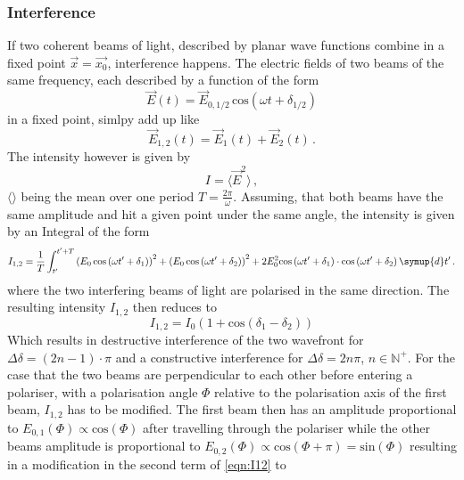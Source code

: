 \subsubsection{Interference}
If two coherent beams of light, described by planar wave functions combine in a fixed point $\vec{x} = \vec{x_0}$, interference happens. The electric fields of two beams of the same frequency, each described by a function of the form 
\begin{equation}
    \vec{E}\left( t\right) = \vec{E}_{0,1/2} \, \text{cos} \left(\omega t + \delta_{1/2}\right)
\end{equation}
in a fixed point, simlpy add up like
\begin{equation}
    \vec{E}_{1,2}\left( t\right) = \vec{E}_{1}\left( t\right) + \vec{E}_{2}\left( t\right) \, .
\end{equation}
The intensity however is given by 
\begin{equation}
    I = \langle \vec{E}^2 \rangle \, ,
\end{equation}
$\langle \rangle$ being the mean over one period $T = \frac{2 \pi}{\omega}$. Assuming, that both beams have the same amplitude and hit a given point under the same angle, the intensity is given by an Integral of the form
\begin{equation}
    I_{1,2} = \frac{1}{T} \int_{t'}^{t' + T} \left( E_0 \, \text{cos}\left( \omega t' + \delta_1 \right) \right)^2 + \left( E_0 \, \text{cos}\left( \omega t' + \delta_2 \right) \right)^2 + 2 E_0^2 \text{cos}\left( \omega t' + \delta_1 \right) \cdot \text{cos}\left( \omega t' + \delta_2 \right) \symup{d}t' \, . 
\end{equation}
where the two interfering beams of light are polarised in the same direction.
The resulting intensity $I_{1,2}$ then reduces to 
\begin{equation}
    \label{eqn:I12}
    I_{1,2} = I_0 \left( 1 + \text{cos}\left( \delta_1 - \delta_2 \right) \right)
\end{equation}
Which results in destructive interference of the two wavefront for $\Delta \delta = \left( 2n - 1 \right) \cdot \pi$ and a constructive interference for $\Delta \delta = 2 n \pi $, $n \in \mathbb{N}^+$.
For the case that the two beams are perpendicular to each other before entering a polariser, with a polarisation angle $\Phi$ relative to the polarisation axis of the first beam, $I_{1,2}$ has to be modified. The first beam then has an amplitude proportional to $E_{0,1}\left(\Phi\right) \propto \text{cos}\left( \Phi \right)$ after travelling through the polariser while the other beams amplitude is proportional to $E_{0,2}\left(\Phi\right) \propto \text{cos}\left( \Phi + \pi\right) = \text{sin}\left( \Phi \right)$ resulting in a modification in the second term of \autoref{eqn:I12} to
